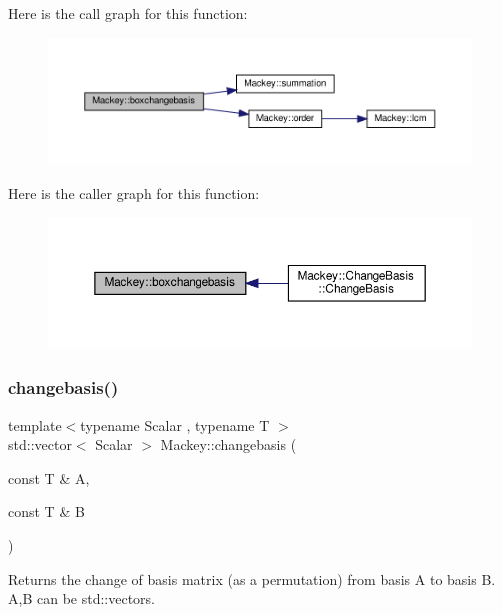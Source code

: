 Here is the call graph for this function\+:\nopagebreak
\begin{figure}[H]
\begin{center}
\leavevmode
\includegraphics[width=350pt]{namespaceMackey_a90ea60504ffb74da3a53875368225f8f_cgraph}
\end{center}
\end{figure}
Here is the caller graph for this function\+:\nopagebreak
\begin{figure}[H]
\begin{center}
\leavevmode
\includegraphics[width=350pt]{namespaceMackey_a90ea60504ffb74da3a53875368225f8f_icgraph}
\end{center}
\end{figure}
\mbox{\label{namespaceMackey_acfe96d099f378714f3383db219c525ec}} 
\subsubsection{\texorpdfstring{changebasis()}{changebasis()}}
{\footnotesize\ttfamily template$<$typename Scalar , typename T $>$ \\
std\+::vector$<$ Scalar $>$ Mackey\+::changebasis (\begin{DoxyParamCaption}\item[{const T \&}]{A,  }\item[{const T \&}]{B }\end{DoxyParamCaption})}



Returns the change of basis matrix (as a permutation) from basis A to basis B. A,B can be std\+::vector\textquotesingle{}s. 


